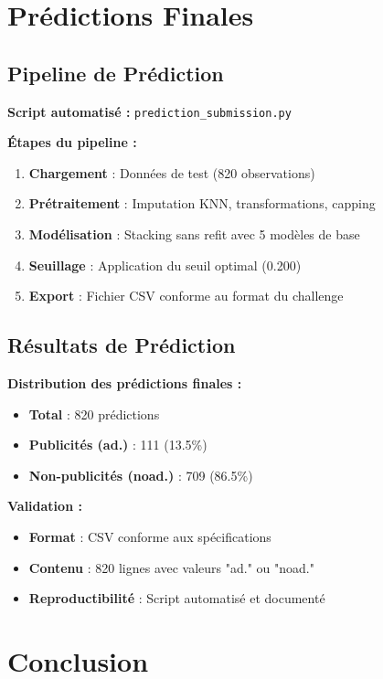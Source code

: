 \documentclass[12pt,a4paper]{article}
\begin{document}
\section{Prédictions Finales}

\subsection{Pipeline de Prédiction}

\textbf{Script automatisé :} \texttt{prediction\_submission.py}

\textbf{Étapes du pipeline :}
\begin{enumerate}
    \item \textbf{Chargement} : Données de test (820 observations)
    \item \textbf{Prétraitement} : Imputation KNN, transformations, capping
    \item \textbf{Modélisation} : Stacking sans refit avec 5 modèles de base
    \item \textbf{Seuillage} : Application du seuil optimal (0.200)
    \item \textbf{Export} : Fichier CSV conforme au format du challenge
\end{enumerate}

\subsection{Résultats de Prédiction}

\textbf{Distribution des prédictions finales :}
\begin{itemize}
    \item \textbf{Total} : 820 prédictions
    \item \textbf{Publicités (ad.)} : 111 (13.5\%)
    \item \textbf{Non-publicités (noad.)} : 709 (86.5\%)
\end{itemize}

\textbf{Validation :}
\begin{itemize}
    \item \textbf{Format} : CSV conforme aux spécifications
    \item \textbf{Contenu} : 820 lignes avec valeurs "ad." ou "noad."
    \item \textbf{Reproductibilité} : Script automatisé et documenté
\end{itemize}

\section{Conclusion}
\end{document}
